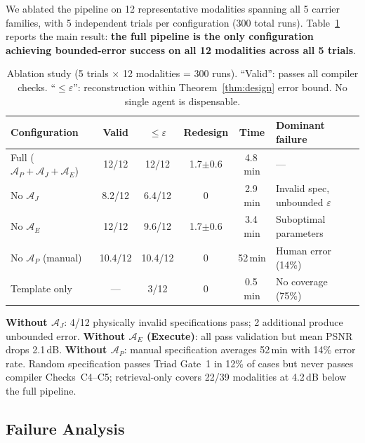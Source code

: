 \documentclass[11pt,a4paper]{article}
\newcommand{\eps}{\varepsilon}
\newcommand{\Agent}{\mathcal{A}}
\begin{document}
We ablated the pipeline on 12 representative modalities spanning all 5 carrier families, with 5 independent trials per configuration (300 total runs).  Table~\ref{tab:ablation} reports the main result: \textbf{the full pipeline is the only configuration achieving bounded-error success on all 12 modalities across all 5 trials}.

\begin{table}[htbp]
\centering
\caption{Ablation study (5 trials $\times$ 12 modalities = 300 runs).  ``Valid'': passes all compiler checks.  ``$\leq \eps$'': reconstruction within Theorem~\ref{thm:design} error bound.  No single agent is dispensable.}
\label{tab:ablation}
\small
\begin{tabularx}{\textwidth}{@{}Xccccl@{}}
\toprule
\textbf{Configuration} & \textbf{Valid} & \textbf{$\leq \eps$} & \textbf{Redesign} & \textbf{Time} & \textbf{Dominant failure} \\
\midrule
Full ($\Agent_P{+}\Agent_J{+}\Agent_E$) & 12/12 & 12/12 & 1.7$\pm$0.6 & 4.8\,min & --- \\
No $\Agent_J$ & 8.2/12 & 6.4/12 & 0 & 2.9\,min & Invalid spec, unbounded $\eps$ \\
No $\Agent_E$ & 12/12 & 9.6/12 & 1.7$\pm$0.6 & 3.4\,min & Suboptimal parameters \\
No $\Agent_P$ (manual) & 10.4/12 & 10.4/12 & 0 & 52\,min & Human error (14\%) \\
Template only & --- & 3/12 & 0 & 0.5\,min & No coverage (75\%) \\
\bottomrule
\end{tabularx}
\end{table}

\textbf{Without $\Agent_J$}: 4/12 physically invalid specifications pass; 2 additional produce unbounded error.
\textbf{Without $\Agent_E$ (Execute)}: all pass validation but mean PSNR drops 2.1\,dB.
\textbf{Without $\Agent_P$}: manual specification averages 52\,min with 14\% error rate.
Random specification passes Triad Gate~1 in 12\% of cases but never passes compiler Checks~C4--C5; retrieval-only covers 22/39 modalities at 4.2\,dB below the full pipeline.

\subsection{Failure Analysis}
\label{sec:failure}
\end{document}
